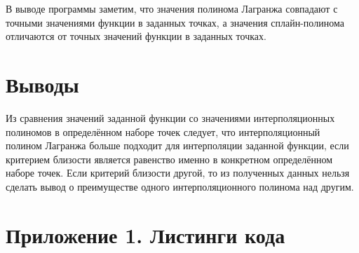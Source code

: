 В выводе программы заметим, что значения полинома Лагранжа совпадают с точными значениями функции в заданных точках, а значения сплайн-полинома отличаются от точных значений функции в заданных точках.

\section{Выводы}
Из сравнения значений заданной функции со значениями интерполяционных полиномов в определённом наборе точек следует, что интерполяционный полином Лагранжа больше подходит для интерполяции заданной функции, если критерием близости является равенство именно в конкретном определённом наборе точек. Если критерий близости другой, то из полученных данных нельзя сделать вывод о преимуществе одного интерполяционного полинома над другим.

\newpage

\section*{Приложение 1. Листинги кода}


\parindent=1cm %

\newpage


\parindent=1cm %


\parindent=1cm %


\parindent=1cm %


\parindent=1cm %


